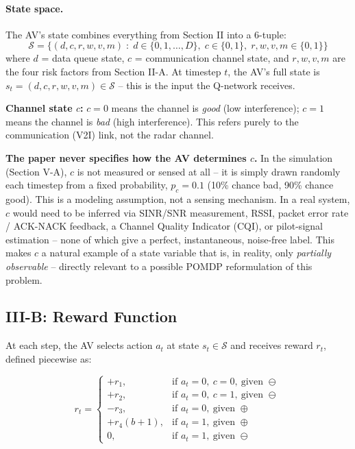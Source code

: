 \documentclass[11pt]{article}
\begin{document}
\paragraph{State space.} The AV's state combines everything from Section II into a
6-tuple:
\begin{equation}
    \mathcal{S} = \big\{ (d,c,r,w,v,m) \;:\; d \in \{0,1,\dots,D\},\; c \in \{0,1\},\;
    r,w,v,m \in \{0,1\} \big\}
\end{equation}
where $d$ = data queue state, $c$ = communication channel state, and $r,w,v,m$ are the
four risk factors from Section II-A. At timestep $t$, the AV's full state is
$s_t = (d,c,r,w,v,m) \in \mathcal{S}$ -- this is the input the Q-network receives.

\begin{definitionbox}
\textbf{Channel state $c$:} $c=0$ means the channel is \emph{good} (low interference);
$c=1$ means the channel is \emph{bad} (high interference). This refers purely to the
communication (V2I) link, not the radar channel.
\end{definitionbox}

\begin{remark}
\textbf{The paper never specifies how the AV determines $c$.} In the simulation
(Section V-A), $c$ is not measured or sensed at all -- it is simply drawn randomly each
timestep from a fixed probability, $p_c = 0.1$ (10\% chance bad, 90\% chance good). This
is a modeling assumption, not a sensing mechanism. In a real system, $c$ would need to
be inferred via SINR/SNR measurement, RSSI, packet error rate / ACK-NACK feedback, a
Channel Quality Indicator (CQI), or pilot-signal estimation -- none of which give a
perfect, instantaneous, noise-free label. This makes $c$ a natural example of a
state variable that is, in reality, only \emph{partially observable} -- directly
relevant to a possible POMDP reformulation of this problem.
\end{remark}

\subsection{III-B: Reward Function}
At each step, the AV selects action $a_t$ at state $s_t \in \mathcal{S}$ and receives
reward $r_t$, defined piecewise as:

\begin{equation}
r_t =
\begin{cases}
+r_1, & \text{if } a_t=0,\ c=0,\ \text{given } \ominus \\
+r_2, & \text{if } a_t=0,\ c=1,\ \text{given } \ominus \\
-r_3, & \text{if } a_t=0,\ \text{given } \oplus \\
+r_4(b+1), & \text{if } a_t=1,\ \text{given } \oplus \\
0, & \text{if } a_t=1,\ \text{given } \ominus
\end{cases}
\label{eq:reward}
\end{equation}
\end{document}
